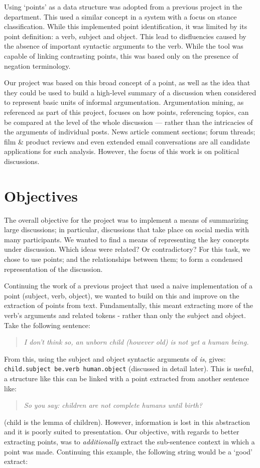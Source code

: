     Using `points' as a data structure was adopted from a previous project in the department. This used a similar concept in a system with a focus on stance classification. While this implemented point identification, it was limited by its point definition: a verb, subject and object. This lead to disfluencies caused by the absence of important syntactic arguments to the verb. While the tool was capable of linking contrasting points, this was based only on the presence of negation terminology.

    Our project was based on this broad concept of a point, as well as the idea that they could be used to build a high-level summary of a discussion when considered to represent basic units of informal argumentation. Argumentation mining, as referenced as part of this project, focuses on how points, referencing topics, can be compared at the level of the whole discussion --- rather than the intricacies of the arguments of individual posts. News article comment sections; forum threads; film \& product reviews and even extended email conversations are all candidate applications for such analysis. However, the focus of this work is on political discussions.

  \section{Objectives}
    The overall objective for the project was to implement a means of summarizing large discussions; in particular, discussions that take place on social media with many participants. We wanted to find a means of representing the key concepts under discussion. Which ideas were related? Or contradictory? For this task, we chose to use points; and the relationships between them; to form a condensed representation of the discussion.

    Continuing the work of a previous project that used a naive implementation of a point (subject, verb, object), we wanted to build on this and improve on the extraction of points from text. Fundamentally, this meant extracting more of the verb's arguments and related tokens - rather than only the subject and object. Take the following sentence:

    \medskip
    \begin{center}
    \blockquote{\textit{I don't think so, an unborn child (however old) is not yet a human being.}}
    \end{center}
    \medskip

    From this, using the subject and object syntactic arguments of \textit{is}, gives: \texttt{child.subject be.verb human.object} (discussed in detail later). This is useful, a structure like this can be linked with a point extracted from another sentence like: \blockquote{\textit{So you say: children are not complete humans until birth?}} (child is the lemma of children). However, information is lost in this abstraction and it is poorly suited to presentation. Our objective, with regards to better extracting points, was to \textit{additionally} extract the sub-sentence context in which a point was made. Continuing this example, the following string would be a `good' extract:

